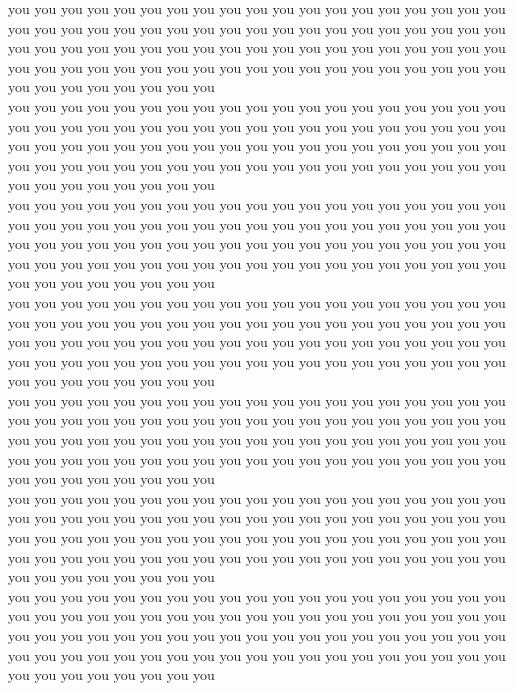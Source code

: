 you you you you you you you you you you you you you you you you you you you you you you you you you you you you you you you you you you you you you you you you you you you you you you you you you you you you you you you you you you you you you you you you you you you you you you you you you you you you you you you you you you you you\\
you you you you you you you you you you you you you you you you you you you you you you you you you you you you you you you you you you you you you you you you you you you you you you you you you you you you you you you you you you you you you you you you you you you you you you you you you you you you you you you you you you you you\\
you you you you you you you you you you you you you you you you you you you you you you you you you you you you you you you you you you you you you you you you you you you you you you you you you you you you you you you you you you you you you you you you you you you you you you you you you you you you you you you you you you you you\\
you you you you you you you you you you you you you you you you you you you you you you you you you you you you you you you you you you you you you you you you you you you you you you you you you you you you you you you you you you you you you you you you you you you you you you you you you you you you you you you you you you you you\\
you you you you you you you you you you you you you you you you you you you you you you you you you you you you you you you you you you you you you you you you you you you you you you you you you you you you you you you you you you you you you you you you you you you you you you you you you you you you you you you you you you you you\\
you you you you you you you you you you you you you you you you you you you you you you you you you you you you you you you you you you you you you you you you you you you you you you you you you you you you you you you you you you you you you you you you you you you you you you you you you you you you you you you you you you you you\\
you you you you you you you you you you you you you you you you you you you you you you you you you you you you you you you you you you you you you you you you you you you you you you you you you you you you you you you you you you you you you you you you you you you you you you you you you you you you you you you you you you you you\\
